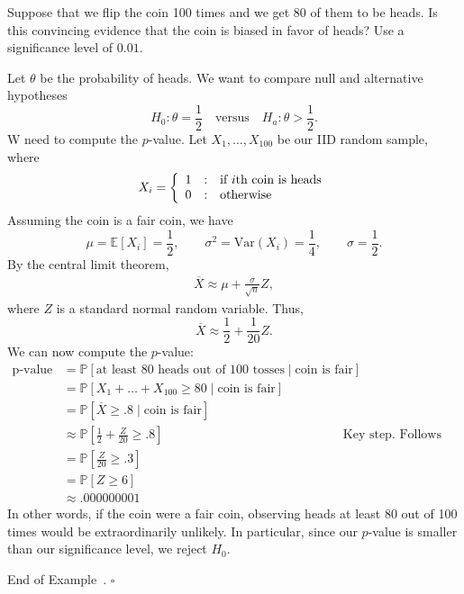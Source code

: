 \documentclass[10pt]{article}
\theoremstyle{definition}
\newtheorem{example}[theorem]{Example}
\renewenvironment{example}
{\begin{oldexample}}
  {\par\smallskip\hfill   End of Example~\theexample. $\square$    \par\end{oldexample}}
\newcommand{\1}[1]{\textbf{1}_{\left[#1\right]}} %
\def\E{\mathbb{E}} %
\def\P{\mathbb{P}} %
\def\Var{\mathrm{Var}} %
\begin{document}
\begin{example}[Coin flipping hypothesis test, $n=100$]
  \label{ex:coin-flipping-hypothesis-test--100-flips}
  Suppose that we flip the coin 100 times and we get 80 of them to be
  heads. Is this convincing evidence that the coin is biased in favor of
  heads? Use a significance level of $0.01$.

  Let $\theta$ be the probability of heads. We want to compare null and
  alternative hypotheses
  \begin{equation*}
    H_{0}: \theta=\frac{1}{2} \quad \text{versus} \quad
    H_{a}: \theta>\frac{1}{2}.
  \end{equation*}
  W need to compute the $p$-value. Let $X_{1},\ldots,X_{100}$ be our IID
  random sample, where
  \begin{equation*}
    X_{i} = \left\{ \begin{array}{l@{\quad:\quad}l}
        1 & \text{if $i$th coin is heads}\\
        0& \text{otherwise} \end{array}\right.
  \end{equation*}
  Assuming the coin is a fair coin, we have
  \begin{equation*}
    \mu = \E\left[X_{i} \right] = \frac{1}{2}, \qquad  \sigma^{2} = \Var(X_{i}) =  \frac{1}{4}, \qquad \sigma= \frac{1}{2}.
  \end{equation*}
  By the central limit theorem, 
  \begin{align*}
    \overline{X} \approx \mu + \frac{\sigma}{\sqrt{n}}Z, 
  \end{align*}
  where $Z$ is a standard normal random variable. Thus,
  \begin{equation*}
    \overline{X} \approx \frac{1}{2}+\frac{1}{20}Z.
  \end{equation*}
  We can now compute the $p$-value:
  \begin{align*}
    \text{p-value }
    &= \P\left[\text{at least 80 heads out of 100 tosses}\mid \text{coin is fair} \right]\\
    &= \P\left[X_{1}+\ldots+X_{100}\geq 80 \mid \text{coin is fair}\right]\\
    &= \P\left[\overline{X}\geq .8 \mid \text{coin is fair}\right]\\
    &\approx \P\left[\frac{1}{2}+\frac{Z}{20} \geq .8\right] &&\text{Key
                                                                step. Follows by CLT.}\\
    &= \P\left[\frac{Z}{20} \geq .3\right]\\
    &= \P\left[Z \geq 6 \right]\\
    &\approx .000000001
  \end{align*}
  In other words, if the coin were a fair coin, observing heads at least 80
  out of 100 times would be extraordinarily unlikely. In particular, since our
  $p$-value is smaller than our significance level, we reject $H_{0}$.
\end{example}
\end{document}
